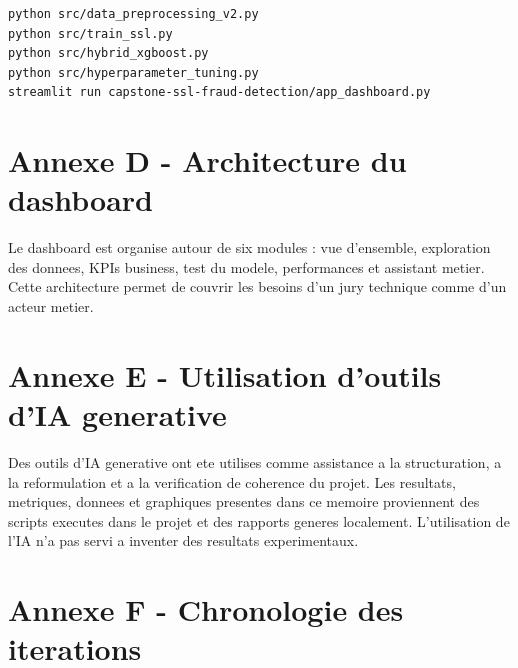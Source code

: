 ﻿\documentclass[12pt,a4paper]{report}
\begin{document}
\begin{verbatim}
python src/data_preprocessing_v2.py
python src/train_ssl.py
python src/hybrid_xgboost.py
python src/hyperparameter_tuning.py
streamlit run capstone-ssl-fraud-detection/app_dashboard.py
\end{verbatim}

\chapter{Annexe D - Architecture du dashboard}

Le dashboard est organise autour de six modules : vue d'ensemble, exploration des donnees, KPIs business, test du modele, performances et assistant metier. Cette architecture permet de couvrir les besoins d'un jury technique comme d'un acteur metier.

\chapter{Annexe E - Utilisation d'outils d'IA generative}

Des outils d'IA generative ont ete utilises comme assistance a la structuration, a la reformulation et a la verification de coherence du projet. Les resultats, metriques, donnees et graphiques presentes dans ce memoire proviennent des scripts executes dans le projet et des rapports generes localement. L'utilisation de l'IA n'a pas servi a inventer des resultats experimentaux.

\chapter{Annexe F - Chronologie des iterations}
\end{document}
